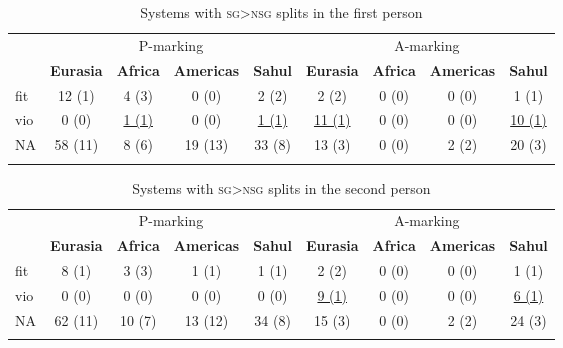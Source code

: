 \documentclass[output=paper]{langscibook}
\begin{document}
\begin{table}
\caption{Systems with \textsc{sg>nsg} splits in the first person}
\label{18-sc-tab:10a} 
\begin{tabularx}{\textwidth}{l@{\hspace{1em}} cccccccc} 
\lsptoprule
& \multicolumn{4}{c}{P-marking} & \multicolumn{4}{c}{A-marking}\\

& \bfseries Eurasia & \bfseries Africa & \bfseries Americas & \bfseries Sahul   & \bfseries Eurasia & \bfseries Africa & \bfseries Americas & \bfseries Sahul\\
\midrule

fit & 12 (1) & 4 (3) & 0 (0) & 2  (2)& 2  (2)& 0 (0) & 0 (0) & 1 (1)\\
vio & 0 (0) & \underline{1 (1)} & 0 (0) & \underline{1 (1)}&  \underline{11 (1)}& 0 (0) & 0 (0) & \underline{10 (1)}\\
NA & 58 (11) & 8 (6) & 19 (13) & 33 (8)  & 13 (3) & 0 (0) & 2  (2) & 20 (3)\\
\lspbottomrule
\end{tabularx}
\end{table}

\begin{table}

\caption{Systems with \textsc{sg>nsg} splits in the second person}
\label{18-sc-tab:10b} 

\begin{tabularx}{\textwidth}{l@{\hspace{1em}} cccccccc}
\lsptoprule
& \multicolumn{4}{c}{P-marking} & \multicolumn{4}{c}{A-marking}\\

& \bfseries Eurasia & \bfseries Africa & \bfseries Americas & \bfseries Sahul   & \bfseries Eurasia & \bfseries Africa & \bfseries Americas & \bfseries Sahul\\
\midrule

fit & 8 (1) & 3 (3) & 1 (1) & 1 (1) &  2  (2)& 0 (0) & 0 (0) & 1 (1)\\
vio & 0 (0) & 0 (0) & 0 (0) & 0 (0)  & \underline{9 (1)} & 0 (0) & 0 (0) & \underline{6 (1)}\\
NA & 62 (11) & 10 (7) & 13 (12) & 34 (8)  & 15 (3) & 0 (0) & 2  (2) & 24 (3)\\
\lspbottomrule
\end{tabularx}
\end{table}
\end{document}
